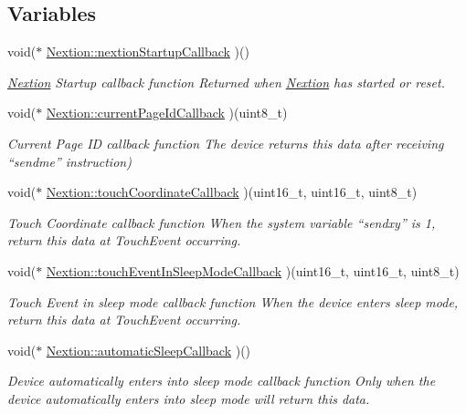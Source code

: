 \subsection*{Variables}
\begin{DoxyCompactItemize}
\item 
void($\ast$ \hyperlink{group___core_a_p_i_ga3d753a2fb4365352720352570b890c44}{Nextion\+::nextion\+Startup\+Callback} )()
\begin{DoxyCompactList}\small\item\em \hyperlink{class_nextion}{Nextion} Startup callback function Returned when \hyperlink{class_nextion}{Nextion} has started or reset. \end{DoxyCompactList}\item 
void($\ast$ \hyperlink{group___core_a_p_i_gaebfa8d976f00a1c4c68163885525954f}{Nextion\+::current\+Page\+Id\+Callback} )(uint8\+\_\+t)
\begin{DoxyCompactList}\small\item\em Current Page I\+D callback function The device returns this data after receiving “sendme” instruction) \end{DoxyCompactList}\item 
void($\ast$ \hyperlink{group___core_a_p_i_ga951cde4126a1f70f7294d6126b096901}{Nextion\+::touch\+Coordinate\+Callback} )(uint16\+\_\+t, uint16\+\_\+t, uint8\+\_\+t)
\begin{DoxyCompactList}\small\item\em Touch Coordinate callback function When the system variable “sendxy” is 1, return this data at Touch\+Event occurring. \end{DoxyCompactList}\item 
void($\ast$ \hyperlink{group___core_a_p_i_gaf557c4d26e864cdee80ff251a4ab7c25}{Nextion\+::touch\+Event\+In\+Sleep\+Mode\+Callback} )(uint16\+\_\+t, uint16\+\_\+t, uint8\+\_\+t)
\begin{DoxyCompactList}\small\item\em Touch Event in sleep mode callback function When the device enters sleep mode, return this data at Touch\+Event occurring. \end{DoxyCompactList}\item 
void($\ast$ \hyperlink{group___core_a_p_i_gaf2a0f9a92270df75c04f2ade7736732f}{Nextion\+::automatic\+Sleep\+Callback} )()
\begin{DoxyCompactList}\small\item\em Device automatically enters into sleep mode callback function Only when the device automatically enters into sleep mode will return this data. \end{DoxyCompactList}\item 

\end{DoxyCompactItemize}
